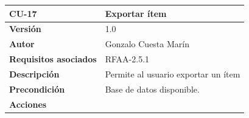\documentclass[
]{article}
\begin{document}
\begin{longtable}[]{@{}ll@{}}
\toprule
\begin{minipage}[b]{0.25\columnwidth}\raggedright
\textbf{CU-17}\strut
\end{minipage} & \begin{minipage}[b]{0.69\columnwidth}\raggedright
\textbf{Exportar ítem}\strut
\end{minipage}\tabularnewline
\midrule
\endhead
\begin{minipage}[t]{0.25\columnwidth}\raggedright
\textbf{Versión}\strut
\end{minipage} & \begin{minipage}[t]{0.69\columnwidth}\raggedright
1.0\strut
\end{minipage}\tabularnewline
\begin{minipage}[t]{0.25\columnwidth}\raggedright
\textbf{Autor}\strut
\end{minipage} & \begin{minipage}[t]{0.69\columnwidth}\raggedright
Gonzalo Cuesta Marín\strut
\end{minipage}\tabularnewline
\begin{minipage}[t]{0.25\columnwidth}\raggedright
\textbf{Requisitos asociados}\strut
\end{minipage} & \begin{minipage}[t]{0.69\columnwidth}\raggedright
RFAA-2.5.1\strut
\end{minipage}\tabularnewline
\begin{minipage}[t]{0.25\columnwidth}\raggedright
\textbf{Descripción}\strut
\end{minipage} & \begin{minipage}[t]{0.69\columnwidth}\raggedright
Permite al usuario exportar un ítem\strut
\end{minipage}\tabularnewline
\begin{minipage}[t]{0.25\columnwidth}\raggedright
\textbf{Precondición}\strut
\end{minipage} & \begin{minipage}[t]{0.69\columnwidth}\raggedright
Base de datos disponible.\strut
\end{minipage}\tabularnewline
\begin{minipage}[t]{0.25\columnwidth}\raggedright
\textbf{Acciones}\strut
\end{minipage} & \begin{minipage}[t]{0.69\columnwidth}\raggedright
\begin{enumerate}
\def\labelenumi{\arabic{enumi}.}

\end{enumerate}
\end{minipage}
\end{longtable}
\end{document}
